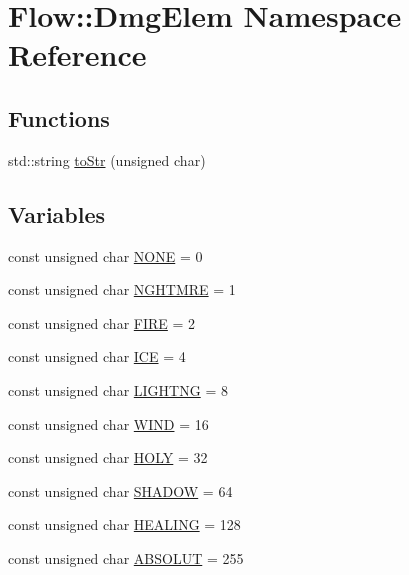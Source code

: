 \hypertarget{namespace_flow_1_1_dmg_elem}{}\section{Flow\+:\+:Dmg\+Elem Namespace Reference}
\label{namespace_flow_1_1_dmg_elem}
\subsection*{Functions}
\begin{DoxyCompactItemize}
\item 
std\+::string \hyperlink{namespace_flow_1_1_dmg_elem_a80b9d857d3c347b4d04d852602ee0060}{to\+Str} (unsigned char)
\end{DoxyCompactItemize}
\subsection*{Variables}
\begin{DoxyCompactItemize}
\item 
const unsigned char \hyperlink{namespace_flow_1_1_dmg_elem_a2c7180f371963927ddcc5b333568a33b}{N\+O\+NE} = 0
\item 
const unsigned char \hyperlink{namespace_flow_1_1_dmg_elem_ab1e9e2aae5dd0691b09de8ade59d3984}{N\+G\+H\+T\+M\+RE} = 1
\item 
const unsigned char \hyperlink{namespace_flow_1_1_dmg_elem_aa25b22e8ba30a8c765912ceda3110cab}{F\+I\+RE} = 2
\item 
const unsigned char \hyperlink{namespace_flow_1_1_dmg_elem_a30739bfaff89a78947afa83acd27fc16}{I\+CE} = 4
\item 
const unsigned char \hyperlink{namespace_flow_1_1_dmg_elem_ae77f57817a01c597933d72de6f00df36}{L\+I\+G\+H\+T\+NG} = 8
\item 
const unsigned char \hyperlink{namespace_flow_1_1_dmg_elem_ab161888a4cffbc8799e450085f9411b9}{W\+I\+ND} = 16
\item 
const unsigned char \hyperlink{namespace_flow_1_1_dmg_elem_a9cf12825628ffbf718079827d6706619}{H\+O\+LY} = 32
\item 
const unsigned char \hyperlink{namespace_flow_1_1_dmg_elem_a97d51ad54a8dceed5f5f3e0e856453e1}{S\+H\+A\+D\+OW} = 64
\item 
const unsigned char \hyperlink{namespace_flow_1_1_dmg_elem_af91abc6a76da493ae0aab97998f10a3c}{H\+E\+A\+L\+I\+NG} = 128
\item 
const unsigned char \hyperlink{namespace_flow_1_1_dmg_elem_a91b40559f8ea36309d1459ae990e7737}{A\+B\+S\+O\+L\+UT} = 255
\end{DoxyCompactItemize}


